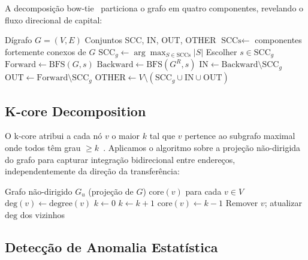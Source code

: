 \documentclass[12pt,a4paper]{article}
\begin{document}
A decomposição bow-tie~\cite{broder2000} particiona o grafo em quatro componentes, revelando o fluxo direcional de capital:

\begin{algorithm}[H]
\caption{Decomposição Bow-Tie}
\begin{algorithmic}[1]
\Require Dígrafo $G = (V, E)$
\Ensure Conjuntos SCC, IN, OUT, OTHER
\State $\text{SCCs} \gets$ componentes fortemente conexos de $G$
\State $\text{SCC}_g \gets \arg\max_{S \in \text{SCCs}} |S|$
\State Escolher $s \in \text{SCC}_g$
\State $\text{Forward} \gets \text{BFS}(G, s)$ 
\State $\text{Backward} \gets \text{BFS}(G^R, s)$ 
\State $\text{IN} \gets \text{Backward} \setminus \text{SCC}_g$
\State $\text{OUT} \gets \text{Forward} \setminus \text{SCC}_g$
\State $\text{OTHER} \gets V \setminus (\text{SCC}_g \cup \text{IN} \cup \text{OUT})$
\end{algorithmic}
\end{algorithm}

\subsection{K-core Decomposition}

O k-core atribui a cada nó $v$ o maior $k$ tal que $v$ pertence ao subgrafo maximal onde todos têm grau $\geq k$~\cite{batagelj2003}. Aplicamos o algoritmo sobre a projeção não-dirigida do grafo para capturar integração bidirecional entre endereços, independentemente da direção da transferência:

\begin{algorithm}[H]
\caption{K-core Decomposition}
\begin{algorithmic}[1]
\Require Grafo não-dirigido $G_u$ (projeção de $G$)
\Ensure $\text{core}(v)$ para cada $v \in V$
 $\text{deg}(v) \gets \text{degree}(v)$ \EndFor
\State $k \gets 0$
  \State $k \gets k + 1$
    \State $\text{core}(v) \gets k - 1$
    \State Remover $v$; atualizar $\text{deg}$ dos vizinhos
  \EndWhile
\EndWhile
\end{algorithmic}
\end{algorithm}

\subsection{Detecção de Anomalia Estatística}
\end{document}
